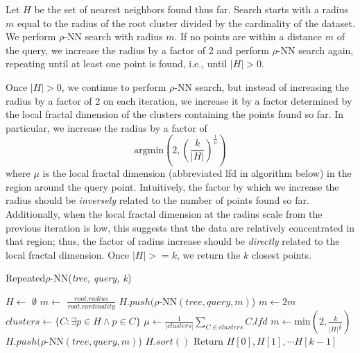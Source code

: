 Let $H$ be the set of nearest neighbors found thus far.
Search starts with a radius $m$ equal to the radius of the root cluster divided by
the cardinality of the dataset. We perform $\rho$-NN search with radius $m$. 
If no points are within a distance $m$ of the query, we increase the radius by a factor of 
2 and perform $\rho$-NN search again, repeating until at least one point is found, i.e., 
until $|H| > 0$.


Once $|H| > 0$, we continue to perform $\rho$-NN search, but instead of 
increasing the radius by a factor of 2 on each iteration, we increase it by a factor determined 
by the local fractal dimension of the clusters containing the points found so far. In particular, 
we increase the radius by a factor of 
\begin{equation} \text{argmin}\left(2, \left({\frac{k}{|H|}}\right)^{\frac{1}{\mu}}\right) \label{2} \end{equation}
where $\mu$ is the local fractal dimension (abbreviated lfd in algorithm below) in the region around the query point.
Intuitively, the factor by which we increase the radius should be \emph{inversely} related to the number of points found so far. 
Additionally, when the local fractal dimension at the radius scale from the previous iteration is low, this suggests that the data 
are relatively concentrated in that region; thus, the factor of radius increase should be \emph{directly} related to the 
local fractal dimension. Once $|H| >= k$, we return the $k$ closest points.

\begin{algorithm} %
    \caption{Repeated$\rho$-NN(\emph{tree, query, k})} %
    \label{alg:knn-by-rnn} %
    \begin{algorithmic}[4] %
        \STATE $H \leftarrow$ $\emptyset$
        \STATE $m \leftarrow$ $\frac{root.radius}{root.cardinality}$
            \STATE $H.push(\rho$-NN$(tree, query, m)$)
            \STATE $m \leftarrow 2m$
        \ENDWHILE
            \STATE $clusters \leftarrow \{ C: \exists p \in H \land p \in C \}$
            \STATE $\mu \leftarrow \frac{1}{|clusters|} \sum_{C \in clusters} C.lfd$
            \STATE $m \leftarrow \text{min}\left(2, \frac{k}{|H|^{\frac{1}{\mu}}}\right)$
            \STATE $H.push(\rho$-NN$(tree, query, m)$)
        \ENDWHILE
        \STATE $H.sort()$
        \STATE Return $H[0], H[1], \cdots H[k-1]$
    \end{algorithmic}
    \end{algorithm}


